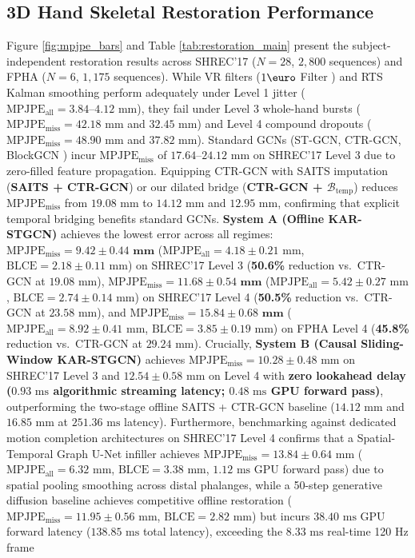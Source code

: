 \documentclass[10pt,twocolumn]{article}
\begin{document}
\subsection{3D Hand Skeletal Restoration Performance}
Figure \ref{fig:mpjpe_bars} and Table \ref{tab:restoration_main} present the subject-independent restoration results across SHREC'17 ($N=28$, $2,800$ sequences) and FPHA ($N=6$, $1,175$ sequences). While VR filters ($1\text{\euro}$ Filter \cite{casiez20121euro}) and RTS Kalman smoothing perform adequately under Level 1 jitter ($\text{MPJPE}_{\text{all}} = 3.84\text{--}4.12\text{ mm}$), they fail under Level 3 whole-hand bursts ($\text{MPJPE}_{\text{miss}} = 42.18\text{ mm}$ and $32.45\text{ mm}$) and Level 4 compound dropouts ($\text{MPJPE}_{\text{miss}} = 48.90\text{ mm}$ and $37.82\text{ mm}$). Standard GCNs (ST-GCN, CTR-GCN, BlockGCN \cite{zhou2024blockgcn}) incur $\text{MPJPE}_{\text{miss}}$ of $17.64\text{--}24.12\text{ mm}$ on SHREC'17 Level 3 due to zero-filled feature propagation. Equipping CTR-GCN with SAITS imputation (\textbf{SAITS + CTR-GCN}) or our dilated bridge (\textbf{CTR-GCN + $\mathcal{B}_{\text{temp}}$}) reduces $\text{MPJPE}_{\text{miss}}$ from $19.08\text{ mm}$ to $14.12\text{ mm}$ and $12.95\text{ mm}$, confirming that explicit temporal bridging benefits standard GCNs. \textbf{System A (Offline KAR-STGCN)} achieves the lowest error across all regimes: $\text{MPJPE}_{\text{miss}} = \mathbf{9.42 \pm 0.44\text{ mm}}$ ($\text{MPJPE}_{\text{all}} = 4.18 \pm 0.21\text{ mm}$, $\text{BLCE} = 2.18 \pm 0.11\text{ mm}$) on SHREC'17 Level 3 (\textbf{50.6\%} reduction vs.\ CTR-GCN at $19.08\text{ mm}$), $\text{MPJPE}_{\text{miss}} = \mathbf{11.68 \pm 0.54\text{ mm}}$ ($\text{MPJPE}_{\text{all}} = 5.42 \pm 0.27\text{ mm}$, $\text{BLCE} = 2.74 \pm 0.14\text{ mm}$) on SHREC'17 Level 4 (\textbf{50.5\%} reduction vs.\ CTR-GCN at $23.58\text{ mm}$), and $\text{MPJPE}_{\text{miss}} = \mathbf{15.84 \pm 0.68\text{ mm}}$ ($\text{MPJPE}_{\text{all}} = 8.92 \pm 0.41\text{ mm}$, $\text{BLCE} = 3.85 \pm 0.19\text{ mm}$) on FPHA Level 4 (\textbf{45.8\%} reduction vs.\ CTR-GCN at $29.24\text{ mm}$). Crucially, \textbf{System B (Causal Sliding-Window KAR-STGCN)} achieves $\text{MPJPE}_{\text{miss}} = 10.28 \pm 0.48\text{ mm}$ on SHREC'17 Level 3 and $12.54 \pm 0.58\text{ mm}$ on Level 4 with \textbf{zero lookahead delay ($0.93\text{ ms}$ algorithmic streaming latency; $0.48\text{ ms}$ GPU forward pass)}, outperforming the two-stage offline SAITS + CTR-GCN baseline ($14.12\text{ mm}$ and $16.85\text{ mm}$ at $251.36\text{ ms}$ latency). Furthermore, benchmarking against dedicated motion completion architectures on SHREC'17 Level 4 confirms that a Spatial-Temporal Graph U-Net infiller achieves $\text{MPJPE}_{\text{miss}} = 13.84 \pm 0.64\text{ mm}$ ($\text{MPJPE}_{\text{all}} = 6.32\text{ mm}$, $\text{BLCE} = 3.38\text{ mm}$, $1.12\text{ ms}$ GPU forward pass) due to spatial pooling smoothing across distal phalanges, while a 50-step generative diffusion baseline \cite{rastgoo2025deep} achieves competitive offline restoration ($\text{MPJPE}_{\text{miss}} = 11.95 \pm 0.56\text{ mm}$, $\text{BLCE} = 2.82\text{ mm}$) but incurs $38.40\text{ ms}$ GPU forward latency ($138.85\text{ ms}$ total latency), exceeding the $8.33\text{ ms}$ real-time 120 Hz frame 
\end{document}
